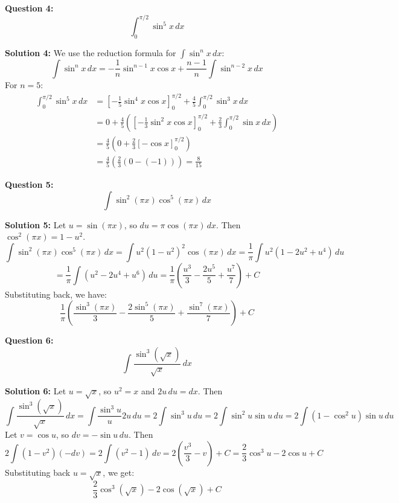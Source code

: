 \documentclass{article}
\begin{document}
\bigskip

\textbf{Question 4:}
\[ \int_0^{\pi/2} \sin^5 x \, dx \]

\textbf{Solution 4:}
\textcolor[rgb]{1.000, 0.000, 0.000}{We use the reduction formula for $\int \sin^n x \, dx$:
\[ \int \sin^n x \, dx = -\frac{1}{n} \sin^{n-1} x \cos x + \frac{n-1}{n} \int \sin^{n-2} x \, dx \]
For $n=5$:
\begin{align*} \int_0^{\pi/2} \sin^5 x \, dx &= \left[ -\frac{1}{5} \sin^4 x \cos x \right]_0^{\pi/2} + \frac{4}{5} \int_0^{\pi/2} \sin^3 x \, dx \\ &= 0 + \frac{4}{5} \left( \left[ -\frac{1}{3} \sin^2 x \cos x \right]_0^{\pi/2} + \frac{2}{3} \int_0^{\pi/2} \sin x \, dx \right) \\ &= \frac{4}{5} \left( 0 + \frac{2}{3} [-\cos x]_0^{\pi/2} \right) \\ &= \frac{4}{5} \left( \frac{2}{3} (0 - (-1)) \right) = \frac{8}{15} \end{align*} }

\bigskip

\textbf{Question 5:}
\[ \int \sin^2 (\pi x) \cos^5 (\pi x) \, dx \]

\textbf{Solution 5:}
\textcolor[rgb]{1.000, 0.000, 0.000}{Let $u = \sin(\pi x)$, so $du = \pi \cos(\pi x) \, dx$.  Then $\cos^2(\pi x) = 1 - u^2$.
\[ \int \sin^2 (\pi x) \cos^5 (\pi x) \, dx = \int u^2 (1-u^2)^2 \cos(\pi x) \, dx = \frac{1}{\pi} \int u^2 (1 - 2u^2 + u^4) \, du \]
\[ = \frac{1}{\pi} \int (u^2 - 2u^4 + u^6) \, du = \frac{1}{\pi} \left( \frac{u^3}{3} - \frac{2u^5}{5} + \frac{u^7}{7} \right) + C \]
Substituting back, we have:
\[ \frac{1}{\pi} \left( \frac{\sin^3(\pi x)}{3} - \frac{2\sin^5(\pi x)}{5} + \frac{\sin^7(\pi x)}{7} \right) + C \]}

\bigskip

\textbf{Question 6:}
\[ \int \frac{\sin^3 (\sqrt{x})}{\sqrt{x}} \, dx \]

\textbf{Solution 6:}
\textcolor[rgb]{1.000, 0.000, 0.000}{Let $u = \sqrt{x}$, so $u^2 = x$ and $2u \, du = dx$. Then
\[ \int \frac{\sin^3 (\sqrt{x})}{\sqrt{x}} \, dx = \int \frac{\sin^3 u}{u} 2u \, du = 2 \int \sin^3 u \, du = 2 \int \sin^2 u \sin u \, du = 2 \int (1 - \cos^2 u) \sin u \, du \]
Let $v = \cos u$, so $dv = -\sin u \, du$. Then
\[ 2 \int (1 - v^2) (-dv) = 2 \int (v^2 - 1) \, dv = 2 \left( \frac{v^3}{3} - v \right) + C = \frac{2}{3} \cos^3 u - 2 \cos u + C \]
Substituting back $u = \sqrt{x}$, we get:
\[ \frac{2}{3} \cos^3 (\sqrt{x}) - 2 \cos (\sqrt{x}) + C \]}

\bigskip
\end{document}
